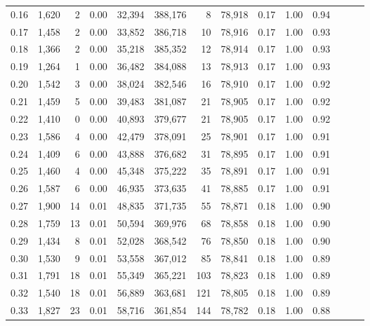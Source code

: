 \begin{tabular}{rrrrrrrrrrrrrr}
0.16 &   1,620 &      2 &  0.00 &   32,394 &  388,176 &       8 &  78,918 &  0.17 &  1.00 &      0.94 \\
0.17 &   1,458 &      2 &  0.00 &   33,852 &  386,718 &      10 &  78,916 &  0.17 &  1.00 &      0.93 \\
0.18 &   1,366 &      2 &  0.00 &   35,218 &  385,352 &      12 &  78,914 &  0.17 &  1.00 &      0.93 \\
0.19 &   1,264 &      1 &  0.00 &   36,482 &  384,088 &      13 &  78,913 &  0.17 &  1.00 &      0.93 \\
0.20 &   1,542 &      3 &  0.00 &   38,024 &  382,546 &      16 &  78,910 &  0.17 &  1.00 &      0.92 \\
0.21 &   1,459 &      5 &  0.00 &   39,483 &  381,087 &      21 &  78,905 &  0.17 &  1.00 &      0.92 \\
0.22 &   1,410 &      0 &  0.00 &   40,893 &  379,677 &      21 &  78,905 &  0.17 &  1.00 &      0.92 \\
0.23 &   1,586 &      4 &  0.00 &   42,479 &  378,091 &      25 &  78,901 &  0.17 &  1.00 &      0.91 \\
0.24 &   1,409 &      6 &  0.00 &   43,888 &  376,682 &      31 &  78,895 &  0.17 &  1.00 &      0.91 \\
0.25 &   1,460 &      4 &  0.00 &   45,348 &  375,222 &      35 &  78,891 &  0.17 &  1.00 &      0.91 \\
0.26 &   1,587 &      6 &  0.00 &   46,935 &  373,635 &      41 &  78,885 &  0.17 &  1.00 &      0.91 \\
0.27 &   1,900 &     14 &  0.01 &   48,835 &  371,735 &      55 &  78,871 &  0.18 &  1.00 &      0.90 \\
0.28 &   1,759 &     13 &  0.01 &   50,594 &  369,976 &      68 &  78,858 &  0.18 &  1.00 &      0.90 \\
0.29 &   1,434 &      8 &  0.01 &   52,028 &  368,542 &      76 &  78,850 &  0.18 &  1.00 &      0.90 \\
0.30 &   1,530 &      9 &  0.01 &   53,558 &  367,012 &      85 &  78,841 &  0.18 &  1.00 &      0.89 \\
0.31 &   1,791 &     18 &  0.01 &   55,349 &  365,221 &     103 &  78,823 &  0.18 &  1.00 &      0.89 \\
0.32 &   1,540 &     18 &  0.01 &   56,889 &  363,681 &     121 &  78,805 &  0.18 &  1.00 &      0.89 \\
0.33 &   1,827 &     23 &  0.01 &   58,716 &  361,854 &     144 &  78,782 &  0.18 &  1.00 &      0.88 \\

\end{tabular}
